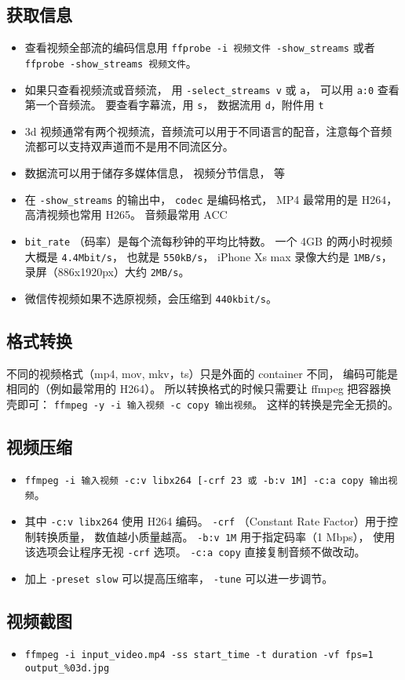 
\begin{issues}
\issueDraft
\end{issues}

\subsection{获取信息}
\begin{itemize}
\item 查看视频全部流的编码信息用 \verb|ffprobe -i 视频文件 -show_streams| 或者 \verb|ffprobe -show_streams 视频文件|。
\item 如果只查看视频流或音频流， 用 \verb|-select_streams v| 或 \verb|a|， 可以用 \verb|a:0| 查看第一个音频流。 要查看字幕流，用 \verb|s|， 数据流用 \verb|d|，附件用 \verb|t|
\item 3d 视频通常有两个视频流，音频流可以用于不同语言的配音，注意每个音频流都可以支持双声道而不是用不同流区分。
\item 数据流可以用于储存多媒体信息， 视频分节信息， 等
\item 在 \verb|-show_streams| 的输出中， \verb|codec| 是编码格式， MP4 最常用的是 H264， 高清视频也常用 H265。 音频最常用 ACC
\item \verb|bit_rate| （码率）是每个流每秒钟的平均比特数。 一个 4GB 的两小时视频大概是 \verb|4.4Mbit/s|， 也就是 \verb|550kB/s|， iPhone Xs max 录像大约是 \verb|1MB/s|， 录屏（886x1920px）大约 \verb|2MB/s|。
\item 微信传视频如果不选原视频，会压缩到 \verb|440kbit/s|。
\end{itemize}

\subsection{格式转换}
不同的视频格式（mp4, mov, mkv，ts）只是外面的 container 不同， 编码可能是相同的（例如最常用的 H264）。 所以转换格式的时候只需要让 ffmpeg 把容器换壳即可： \verb|ffmpeg -y -i 输入视频 -c copy 输出视频|。 这样的转换是完全无损的。

\subsection{视频压缩}
\begin{itemize}
\item \verb|ffmpeg -i 输入视频 -c:v libx264 [-crf 23 或 -b:v 1M] -c:a copy 输出视频|。
\item 其中 \verb|-c:v libx264| 使用 H264 编码。 \verb|-crf| （Constant Rate Factor）用于控制转换质量， 数值越小质量越高。 \verb|-b:v 1M| 用于指定码率（1 Mbps）， 使用该选项会让程序无视 \verb|-crf| 选项。 \verb|-c:a copy| 直接复制音频不做改动。
\item 加上 \verb|-preset slow| 可以提高压缩率， \verb|-tune| 可以进一步调节。
\end{itemize}


\subsection{视频截图}
\begin{itemize}
\item \verb|ffmpeg -i input_video.mp4 -ss start_time -t duration -vf fps=1 output_%03d.jpg|
\end{itemize}
